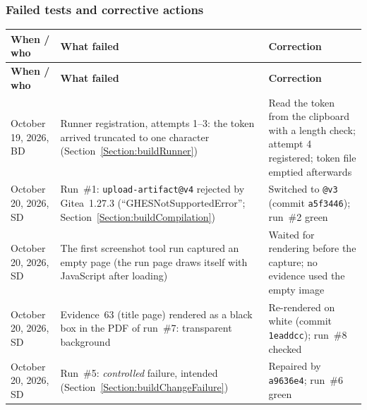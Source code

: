 \subsubsection{Failed tests and corrective actions}
\begin{tabularx}{\linewidth}{L{2.6cm}YY}
\caption{Failed tests and corrective actions in this chapter\label{Table:BuildFailedTests}}\\
\toprule \textbf{When / who} & \textbf{What failed} & \textbf{Correction}\\ \midrule
\endfirsthead
\toprule \textbf{When / who} & \textbf{What failed} & \textbf{Correction}\\ \midrule
\endhead \bottomrule \endlastfoot
October 19, 2026, BD & Runner registration, attempts 1--3: the token arrived truncated to one character (Section~\ref{Section:buildRunner}) & Read the token from the clipboard with a length check; attempt 4 registered; token file emptied afterwards\\
October 20, 2026, SD & Run~\#1: \texttt{upload-artifact@v4} rejected by Gitea~1.27.3 (``GHESNotSupportedError''; Section~\ref{Section:buildCompilation}) & Switched to \texttt{@v3} (commit \texttt{a5f3446}); run~\#2 green\\
October 20, 2026, SD & The first screenshot tool run captured an empty page (the run page draws itself with JavaScript after loading) & Waited for rendering before the capture; no evidence used the empty image\\
October 20, 2026, SD & Evidence~63 (title page) rendered as a black box in the PDF of run~\#7: transparent background & Re-rendered on white (commit \texttt{1eaddcc}); run~\#8 checked\\
October 20, 2026, SD & Run~\#5: \emph{controlled} failure, intended (Section~\ref{Section:buildChangeFailure}) & Repaired by \texttt{a9636e4}; run~\#6 green\\
\end{tabularx}

